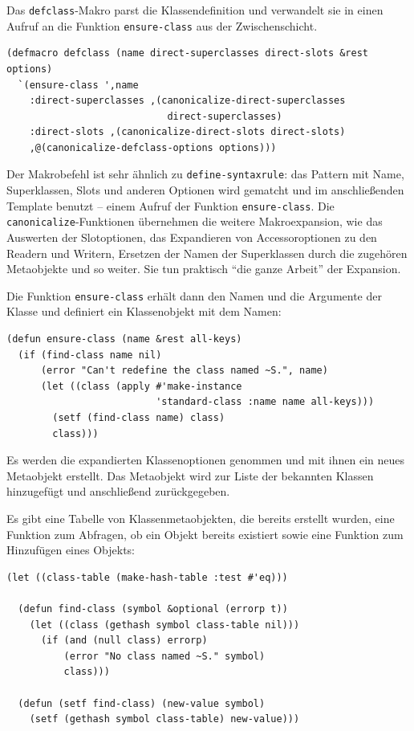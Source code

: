 Das \texttt{defclass}-Makro parst die Klassendefinition und verwandelt sie in einen Aufruf an die Funktion \texttt{ensure-class} aus der Zwischenschicht. 

\begin{lstlisting}
(defmacro defclass (name direct-superclasses direct-slots &rest options)
  `(ensure-class ',name
    :direct-superclasses ,(canonicalize-direct-superclasses 
                            direct-superclasses)
    :direct-slots ,(canonicalize-direct-slots direct-slots)
    ,@(canonicalize-defclass-options options)))
\end{lstlisting}

Der Makrobefehl ist sehr ähnlich zu \texttt{define-syntaxrule}: das Pattern mit Name, Superklassen, Slots und anderen Optionen wird gematcht und im anschließenden Template benutzt -- einem Aufruf der Funktion \texttt{ensure-class}. Die \texttt{canonicalize}-Funktionen übernehmen die weitere Makroexpansion, wie das Auswerten der Slotoptionen, das Expandieren von Accessoroptionen zu den Readern und Writern, Ersetzen der Namen der Superklassen durch die zugehören Metaobjekte und so weiter. Sie tun praktisch ``die ganze Arbeit'' der Expansion.

Die Funktion \texttt{ensure-class} erhält dann den Namen und die Argumente der Klasse und definiert ein Klassenobjekt mit dem Namen:

\begin{lstlisting}
(defun ensure-class (name &rest all-keys)
  (if (find-class name nil)
      (error "Can't redefine the class named ~S.", name)
      (let ((class (apply #'make-instance
                          'standard-class :name name all-keys)))
        (setf (find-class name) class)
        class)))
\end{lstlisting}

Es werden die expandierten Klassenoptionen genommen und mit ihnen ein neues Metaobjekt erstellt. Das Metaobjekt wird zur Liste der bekannten Klassen hinzugefügt und anschließend zurückgegeben. 

Es gibt eine Tabelle von Klassenmetaobjekten, die bereits erstellt wurden, eine Funktion zum Abfragen, ob ein Objekt bereits existiert sowie eine Funktion zum Hinzufügen eines Objekts:

\begin{lstlisting}
(let ((class-table (make-hash-table :test #'eq)))
  
  (defun find-class (symbol &optional (errorp t))
    (let ((class (gethash symbol class-table nil)))
      (if (and (null class) errorp)
          (error "No class named ~S." symbol)
          class)))
  
  (defun (setf find-class) (new-value symbol)
    (setf (gethash symbol class-table) new-value)))
\end{lstlisting}

